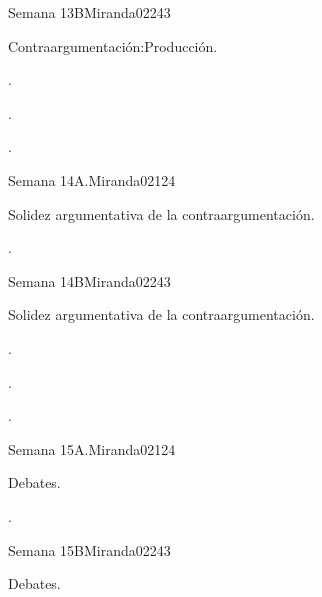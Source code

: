 \begin{syllabus}
\begin{unit}{Semana 13B}{}{Miranda02}{24}{3}
   \begin{topics}
      \item Contraargumentación:Producción.
   \end{topics}

   \begin{learningoutcomes}
      \item . 
      \item .
      \item . 
      \end{learningoutcomes}
\end{unit}

\begin{unit}{Semana 14A.}{}{Miranda02}{12}{4}
   \begin{topics}
      \item Solidez argumentativa de la contraargumentación. 
   \end{topics}
   \begin{learningoutcomes}
      \item . 
   \end{learningoutcomes}
\end{unit}

\begin{unit}{Semana 14B}{}{Miranda02}{24}{3}
   \begin{topics}
      \item Solidez argumentativa de la contraargumentación.
   \end{topics}

   \begin{learningoutcomes}
      \item . 
      \item .
      \item . 
      \end{learningoutcomes}
\end{unit}

\begin{unit}{Semana 15A.}{}{Miranda02}{12}{4}
   \begin{topics}
      \item Debates.
   \end{topics}
   \begin{learningoutcomes}
      \item . 
   \end{learningoutcomes}
\end{unit}

\begin{unit}{Semana 15B}{}{Miranda02}{24}{3}
   \begin{topics}
      \item Debates.
   \end{topics}


\end{unit}
\end{syllabus}
